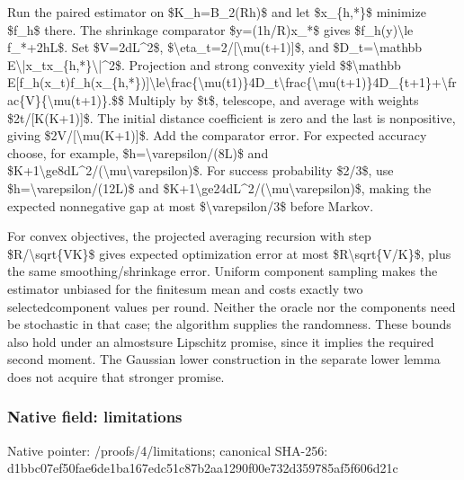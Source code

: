 \documentclass[10pt,a4paper]{article}
\begin{document}
Run the paired estimator on \$K\_h=B\_2(Rh)\$ and let \$x\_\{h,*\}\$ minimize \$f\_h\$ there. The shrinkage comparator \$y=(1h/R)x\_*\$ gives \$f\_h(y)\textbackslash{}le f\_*+2hL\$. Set \$V=2dL\textasciicircum{}2\$, \$\textbackslash{}eta\_t=2/[\textbackslash{}mu(t+1)]\$, and \$D\_t=\textbackslash{}mathbb E\textbackslash{}|x\_tx\_\{h,*\}\textbackslash{}|\textasciicircum{}2\$. Projection and strong convexity yield
\$\$\textbackslash{}mathbb E[f\_h(x\_t)f\_h(x\_\{h,*\})]\allowbreak{}\textbackslash{}le\textbackslash{}frac\{\textbackslash{}mu(t1)\}4D\_t\textbackslash{}\allowbreak{}frac\{\textbackslash{}mu(t+1)\}4D\_\{t+1\}+\textbackslash{}\allowbreak{}frac\{V\}\{\textbackslash{}mu(t+1)\}.\$\$
Multiply by \$t\$, telescope, and average with weights \$2t/[K(K+1)]\$. The initial distance coefficient is zero and the last is nonpositive, giving \$2V/[\textbackslash{}mu(K+1)]\$. Add the comparator error. For expected accuracy choose, for example, \$h=\textbackslash{}varepsilon/(8L)\$ and \$K+1\textbackslash{}ge8dL\textasciicircum{}2/(\textbackslash{}mu\textbackslash{}varepsilon)\$. For success probability \$2/3\$, use \$h=\textbackslash{}varepsilon/(12L)\$ and \$K+1\textbackslash{}ge24dL\textasciicircum{}2/(\textbackslash{}mu\textbackslash{}varepsilon)\$, making the expected nonnegative gap at most \$\textbackslash{}varepsilon/3\$ before Markov.

For convex objectives, the projected averaging recursion with step \$R/\textbackslash{}sqrt\{VK\}\$ gives expected optimization error at most \$R\textbackslash{}sqrt\{V/K\}\$, plus the same smoothing/shrinkage error. Uniform component sampling makes the estimator unbiased for the finitesum mean and costs exactly two selectedcomponent values per round. Neither the oracle nor the components need be stochastic in that case; the algorithm supplies the randomness. These bounds also hold under an almostsure Lipschitz promise, since it implies the required second moment. The Gaussian lower construction in the separate lower lemma does not acquire that stronger promise.


\subsubsection{Native field: limitations}


Native pointer: /proofs/4/limitations; canonical SHA-256: d1bbc07ef50fae6de1ba167e\allowbreak{}dc51c87b2aa1290f00e732d3\allowbreak{}59785af5f606d21c
\end{document}
